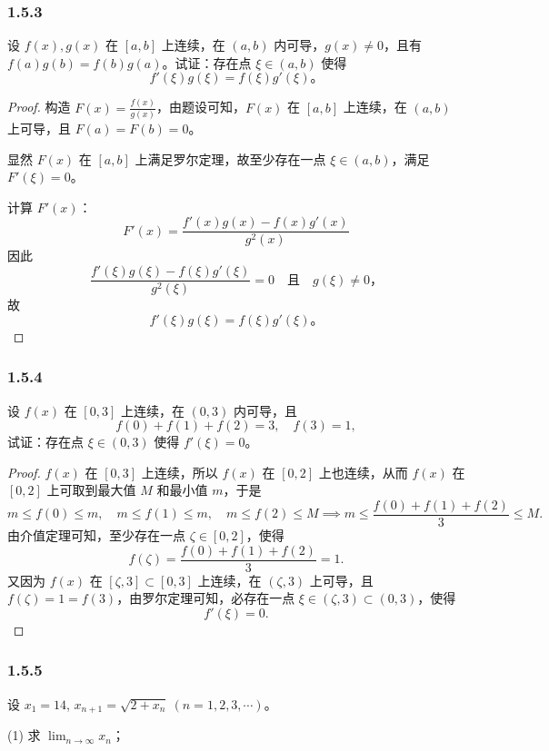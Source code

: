 \documentclass[12pt]{ctexart}
\begin{document}
\subsubsection*{1.5.3}
设 $f(x), g(x)$ 在 $[a, b]$ 上连续，在 $(a, b)$ 内可导，$g(x) \neq 0$，且有 $f(a)g(b) = f(b)g(a)$。试证：存在点 $\xi \in (a, b)$ 使得
\[
f'(\xi)g(\xi) = f(\xi)g'(\xi)。
\]
\begin{proof}
构造 $F(x) = \frac{f(x)}{g(x)}$，由题设可知，$F(x)$ 在 $[a, b]$ 上连续，在 $(a, b)$ 上可导，且 $F(a) = F(b) = 0$。

显然 $F(x)$ 在 $[a, b]$ 上满足罗尔定理，故至少存在一点 $\xi \in (a, b)$，满足 $F'(\xi) = 0$。

计算 $F'(x)$：
\[
F'(x) = \frac{f'(x)g(x) - f(x)g'(x)}{g^2(x)}
\]
因此
\[
\frac{f'(\xi)g(\xi) - f(\xi)g'(\xi)}{g^2(\xi)} = 0 \quad \text{且} \quad g(\xi) \neq 0，
\]
故
\[
f'(\xi)g(\xi) = f(\xi)g'(\xi)。
\]
\end{proof}

\subsubsection*{1.5.4}
设 $f(x)$ 在 $[0, 3]$ 上连续，在 $(0, 3)$ 内可导，且
\[
f(0) + f(1) + f(2) = 3, \quad f(3) = 1,
\]
试证：存在点 $\xi \in (0,3)$ 使得 $f'(\xi) = 0$。
\begin{proof}
$f(x)$ 在 $[0, 3]$ 上连续，所以 $f(x)$ 在 $[0, 2]$ 上也连续，从而 $f(x)$ 在 $[0, 2]$ 上可取到最大值 $M$ 和最小值 $m$，于是
\[
m \leq f(0) \leq m, \quad m \leq f(1) \leq m, \quad m \leq f(2) \leq M \implies m \leq \frac{f(0) + f(1) + f(2)}{3} \leq M.
\]
由介值定理可知，至少存在一点 $\zeta \in [0, 2]$，使得
\[
f(\zeta) = \frac{f(0) + f(1) + f(2)}{3} = 1.
\]
又因为 $f(x)$ 在 $[\zeta, 3] \subset [0, 3]$ 上连续，在 $(\zeta, 3)$ 上可导，且 $f(\zeta) = 1 = f(3)$，由罗尔定理可知，必存在一点 $\xi \in (\zeta, 3) \subset (0, 3)$，使得
\[
f'(\xi) = 0.
\]
\end{proof}

\subsubsection*{1.5.5}
设 $x_1 = 14$, $x_{n+1} = \sqrt{2 + x_n} \ (n = 1, 2, 3, \cdots)$。

(1) 求 $\lim_{n \to \infty} x_n$；
\end{document}
